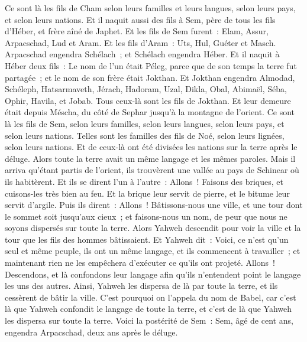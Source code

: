 \begin{multicols}{2}
Ce sont là les fils de Cham selon leurs familles et leurs langues, selon leurs pays, et selon leurs nations.
Et il naquit aussi des fils à Sem, père de tous les fils d'Héber, et frère aîné de Japhet.
Et les fils de Sem furent~: Elam, Assur, Arpacschad, Lud et Aram.
Et les fils d'Aram~: Uts, Hul, Guéter et Masch.
Arpacschad engendra Schélach~; et Schélach engendra Héber.
Et il naquit à Héber deux fils~: Le nom de l'un était Péleg, parce que de son temps la terre fut partagée~; et le nom de son frère était Jokthan.
Et Jokthan engendra Almodad, Schéleph, Hatsarmaveth, Jérach,
Hadoram, Uzal, Dikla,
Obal, Abimaël, Séba,
Ophir, Havila, et Jobab. Tous ceux-là sont les fils de Jokthan.
Et leur demeure était depuis Méscha, du côté de Sephar jusqu'à la montagne de l'orient.
Ce sont là les fils de Sem, selon leurs familles, selon leurs langues, selon leurs pays, et selon leurs nations.
Telles sont les familles des fils de Noé, selon leurs lignées, selon leurs nations. Et de ceux-là ont été divisées les nations sur la terre après le déluge.
\VerseOne{}Alors toute la terre avait un même langage et les mêmes paroles.
Mais il arriva qu'étant partis de l'orient, ils trouvèrent une vallée au pays de Schinear où ils habitèrent.
Et ils se dirent l'un à l'autre~: Allons~! Faisons des briques, et cuisons-les très bien au feu. Et la brique leur servit de pierre, et le bitume leur servit d'argile.
Puis ils dirent~: Allons~! Bâtissons-nous une ville, et une tour dont le sommet soit jusqu'aux cieux~; et faisons-nous un nom, de peur que nous ne soyons dispersés sur toute la terre.
Alors Yahweh descendit pour voir la ville et la tour que les fils des hommes bâtissaient.
Et Yahweh dit~: Voici, ce n'est qu'un seul et même peuple, ils ont un même langage, et ils commencent à travailler~; et maintenant rien ne les empêchera d'exécuter ce qu'ils ont projeté.
Allons~! Descendons, et là confondons leur langage afin qu'ils n'entendent point le langage les uns des autres.
Ainsi, Yahweh les dispersa de là par toute la terre, et ils cessèrent de bâtir la ville.
C'est pourquoi on l'appela du nom de Babel, car c'est là que Yahweh confondit le langage de toute la terre, et c'est de là que Yahweh les dispersa sur toute la terre.
Voici la postérité de Sem~: Sem, âgé de cent ans, engendra Arpacschad, deux ans après le déluge.

\end{multicols}
